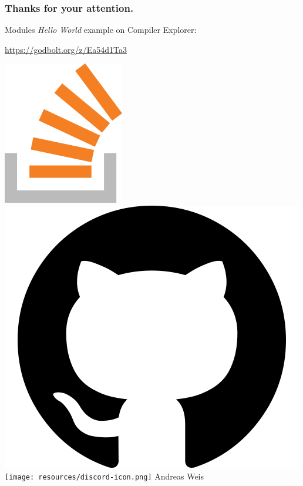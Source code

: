 \documentclass[aspectratio=169]{beamer}
\begin{document}

\begin{frame}
  \frametitle{Thanks for your attention.}

  Modules \emph{Hello World} example on Compiler Explorer:

  \href{https://godbolt.org/z/Ea54d1Ta3}{https://godbolt.org/z/Ea54d1Ta3}
  \vspace{3em}

  \href{https://stackoverflow.com/users/577603/comicsansms}{\includegraphics[height=.05\textheight]{resources/so-icon.png}}
  \href{https://github.com/ComicSansMS}{\includegraphics[height=.05\textheight]{resources/github-icon.png}}
  \texttt{[image: resources/discord-icon.png]} Andreas Weis
\end{frame}
\end{document}
